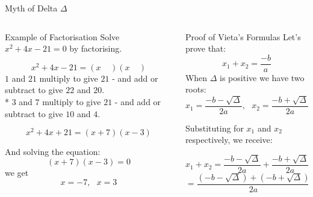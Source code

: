 \documentclass[final]{beamer}
\newlength{\onecolwid}
\newlength{\twocolwid}
\begin{document}
\begin{frame}[t]
\begin{columns}[t]
\begin{column}{\twocolwid}
\begin{alertblock}{Myth of Delta $\Delta$}
\end{alertblock}


\begin{columns}[t,totalwidth=\twocolwid] %

\begin{column}{\onecolwid} %


\begin{block}{Example of Factorisation}
Solve $x^2+4x-21=0$ by factorising.

$$x^2+4x-21=(x\ \ \ \ \ )(x\ \ \ \ \ )$$
$1$ and $21$ multiply to give $21$ - and add or subtract to give $22$ and $20$.\\*
$3$ and $7$ multiply to give $21$ - and add or subtract to give $10$ and \textbf{$4$}.

$$x^2+4x+21 = (x+7)(x-3)$$

And solving the equation:
$$(x+7)(x-3)=0$$
we get
$$x=-7,\ \ \ x=3$$

\end{block}


\end{column} %

\begin{column}{\onecolwid} %


\begin{block}{ Proof of Vieta's Formulas}
Let's prove that:
$$x_1 + x_2 = \frac{-b}{a}$$
When $\Delta$ is positive we have two roots:
$$x_1 = \frac{-b-\sqrt{\Delta}}{2a},\ \ \ x_2 = \frac{-b+\sqrt{\Delta}}{2a}$$

Substituting for $x_1$ and $x_2$ respectively, we receive:

$$x_1 + x_2 = \frac{-b-\sqrt{\Delta}}{2a} + \frac{-b+\sqrt{\Delta}}{2a} =$$
$$ = \frac{(-b-\sqrt{\Delta}) + (-b+\sqrt{\Delta})}{2a} = \frac{-2b}{2a} = \frac{-b}{a}$$


\end{block}
\end{column}
\end{columns}
\end{column}
\end{columns}
\end{frame}
\end{document}
